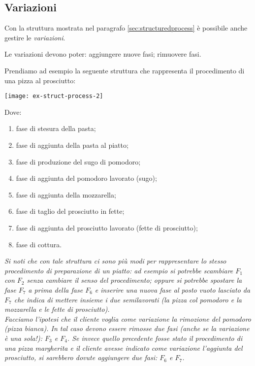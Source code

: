 \subsection{Variazioni}\label{subsec:variations}
Con la struttura mostrata nel paragrafo \vref{sec:structuredprocess} è possibile anche
gestire le {\it variazioni}.

Le variazioni devono poter: aggiungere nuove fasi; rimuovere fasi.

Prendiamo ad esempio la seguente struttura che rappresenta il procedimento di una
pizza al prosciutto:

\vspace{5pt}\centerline{\texttt{[image: ex-struct-process-2]}}

\vspace{15pt}

Dove:
\begin{enumerate}[label=$F_{\arabic*}$:]
    \item fase di stesura della pasta;
    \item fase di aggiunta della pasta al piatto;
    \item fase di produzione del sugo di pomodoro;
    \item fase di aggiunta del pomodoro lavorato (sugo);
    \item fase di aggiunta della mozzarella;
    \item fase di taglio del prosciutto in fette;
    \item fase di aggiunta del prosciutto lavorato (fette di prosciutto);
    \item fase di cottura.
\end{enumerate}
\begingroup\itshape\fontsize{10pt}{10pt}\selectfont
    Si noti che con tale struttura ci sono più modi per rappresentare lo stesso procedimento
    di preparazione di un piatto: ad esempio si potrebbe scambiare $F_{1}$ con $F_{2}$ senza
    cambiare il \textnormal{senso} del procedimento; oppure si potrebbe spostare la fase $F_{7}$ a
    prima della fase $F_{6}$ e inserire una nuova fase al posto vuoto lasciato da $F_{7}$ che
    indica di mettere insieme i due \textnormal{semilavorati} (la pizza col pomodoro e la mozzarella
    e le fette di prosciutto).
\endgroup\\

Facciamo l'ipotesi che il cliente voglia come variazione la rimozione del pomodoro
(pizza bianca). In tal caso devono essere rimosse due fasi (anche se la variazione è
una sola!): $F_{3}$ e $F_{4}$. Se invece quello precedente fosse stato il procedimento
di una pizza margherita e il cliente avesse indicato come variazione l'aggiunta del
prosciutto, si sarebbero dovute aggiungere due fasi: $F_{6}$ e $F_{7}$.


